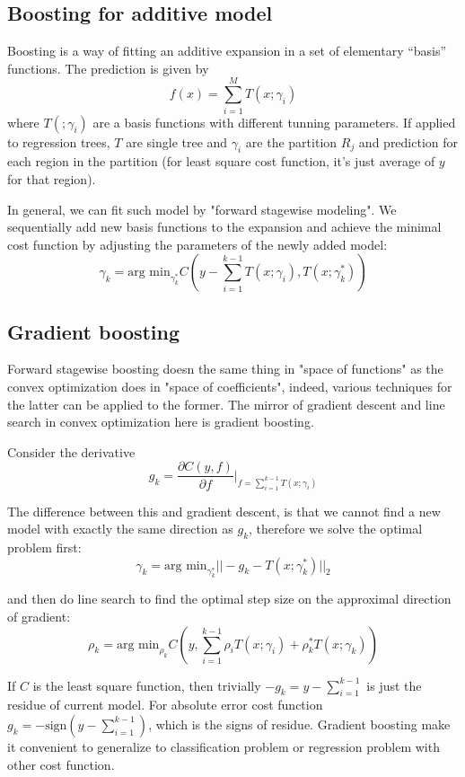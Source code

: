 \documentclass{article}
\begin{document}
\subsection{Boosting for additive model}
Boosting is a way of fitting an additive expansion in a set of elementary “basis” functions. The prediction is given by
\[
f(x)=\sum_{i=1}^MT(x;\gamma_i)
\]
where $T(;\gamma_i)$ are a basis functions with different tunning parameters. If applied to regression trees, $T$ are single tree and $\gamma_i$ are the partition ${R_j}$ and prediction for each region in the partition (for least square cost function, it's just average of $y$ for that region).

In general, we can fit such model by "forward stagewise modeling". We sequentially add new basis functions to the expansion and achieve the minimal cost function by adjusting the parameters of the newly added model:
\[
\gamma_k=\textrm{arg min}_{\gamma_k^*}C(y-\sum_{i=1}^{k-1}T(x;\gamma_i),T(x;\gamma_k^*))
\]

\subsection{Gradient boosting}
Forward stagewise boosting doesn the same thing in "space of functions" as the convex optimization does in "space of coefficients", indeed, various techniques for the latter can be applied to the former. The mirror of gradient descent and line search in convex optimization here is gradient boosting.

Consider the derivative
\[
g_k=\frac{\partial C(y,f)}{\partial f}|_{f=\sum_{i=1}^{k-1}T(x;\gamma_i)}
\]

The difference between this and gradient descent, is that we cannot find a new model with exactly the same direction as $g_k$, therefore we solve the optimal problem first:
\[
\gamma_k=\textrm{arg min}_{\gamma_k^*}||-g_k-T(x;\gamma_k^*)||_2
\]

and then do line search to find the optimal step size on the approximal direction of gradient:
\[
\rho_k=\textrm{arg min}_{\rho_k}C(y,\sum_{i=1}^{k-1}\rho_iT(x;\gamma_i)+\rho_k^*T(x;\gamma_k))
\]

If $C$ is the least square function, then trivially $-g_k=y-\sum_{i=1}^{k-1}$ is just the residue of current model. For absolute error cost function $g_k=-\textrm{sign}(y-\sum_{i=1}^{k-1})$, which is the signs of residue. Gradient boosting make it convenient to generalize to classification problem or regression problem with other cost function.
\end{document}
